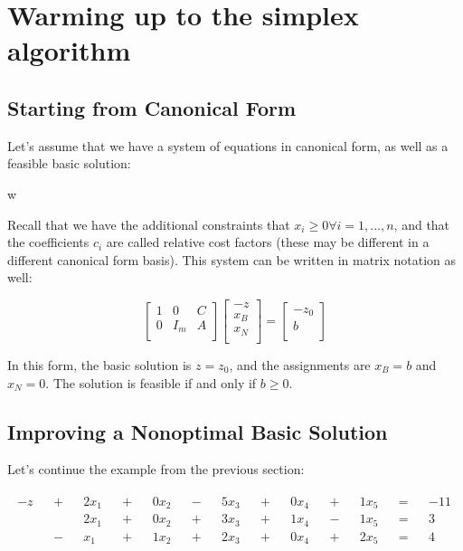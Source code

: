 \section{Warming up to the simplex algorithm}
\subsection{Starting from Canonical Form}
Let's assume that we have a system of equations in canonical form, as well as a feasible basic solution:

w

Recall that we have the additional constraints that $x_i \geq 0 \forall i=1,...,n$, and that the coefficients $c_i$ are called relative cost factors (these may be different in a different canonical form basis). This system can be written in matrix notation as well:

\begin{equation}
\begin{bmatrix}
1 & 0 & C \\
0 & I_m & A \\
\end{bmatrix}
\begin{bmatrix}
-z \\
x_B \\
x_N \\
\end{bmatrix}
=
\begin{bmatrix}
-z_0 \\
b \\
\end{bmatrix}
\end{equation}

In this form, the basic solution is $z = z_0$, and the assignments are $x_B = b$ and $x_N = 0$.  The solution is feasible if and only if $b \geq 0$.

\subsection{Improving a Nonoptimal Basic Solution}
Let's continue the example from the previous section:

\begin{eqnarray}
\label{example_canonical}
\begin{aligned}
-z && + && 2x_1 &&+&& 0x_2 && - && 5x_3 && + && 0x_4 && + && 1x_5 &&=&&-11& \\
&&&& 2x_1 &&+&& 0x_2 &&+ && 3x_3 && + && 1x_4 & &- && 1x_5 &&=&& 3 & \\
&& - && x_1 &&+&& 1x_2 && + && 2x_3 && + && 0x_4 && +&& 2x_5 &&=&& 4 & \\
\end{aligned}
\end{eqnarray}

